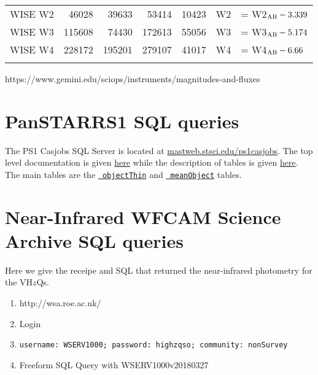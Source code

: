 \documentclass[usenatbib]{mnras}
\begin{document}
\begin{table*}
\begin{center}
\begin{tabular}{l r r r  c l l}
      WISE W2               &    46028    &    39633  &    53414   &  10423    & W2                        &   = W2$_{\rm AB} - 3.339$ \\
      WISE W3               &  115608    &    74430  &  172613   &  55056    & W3                        &   = W3$_{\rm AB} - 5.174$ \\
      WISE W4               &  228172    &  195201  &  279107   &  41017    & W4                        &   = W4$_{\rm AB} - 6.66$ \\
      \hline
      \hline
      \label{tab:filter_details}
    \end{tabular}
     \end{center}
\end{table*}
https://www.gemini.edu/sciops/instruments/magnitudes-and-fluxes

\section{PanSTARRS1 SQL queries}\label{sec:PS1_SQL}
The PS1 Casjobs SQL Server is located at
\href{http://mastweb.stsci.edu/ps1casjobs}{mastweb.stsci.edu/ps1casjobs}.
The top level documentation is given
\href{https://outerspace.stsci.edu/display/PANSTARRS/PS1+Source+extraction+and+catalogs}{here}
while the description of tables is given
\href{https://outerspace.stsci.edu/display/PANSTARRS/PS1+Source+extraction+and+catalogs#PS1Sourceextractionandcatalogs}{here}. The
main tables are the
\href{https://outerspace.stsci.edu/display/PANSTARRS/PS1+ObjectThin+table+fields}{{\tt
objectThin}} and
\href{https://outerspace.stsci.edu/display/PANSTARRS/PS1+MeanObject+table+fields}{{\tt
meanObject}} tables.

\section{Near-Infrared WFCAM Science Archive SQL queries}\label{sec:SQL}
Here we give the receipe and SQL that returned the near-infrared photometry 
for the VH$z$Qs. 

\begin{enumerate}
\item http://wsa.roe.ac.uk/ 
\item Login
\item {\tt username:	WSERV1000;  password: 	highzqso;   community: 	nonSurvey} 
\item Freeform SQL Query with  WSERV1000v20180327
\end{enumerate}













%


\end{document}
